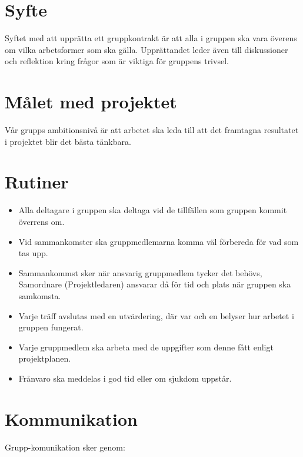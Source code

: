 \documentclass[11pt]{article}
\begin{document}
\begin{flushleft}
\section{Syfte}
Syftet med att upprätta ett gruppkontrakt är att alla i gruppen ska vara överens om vilka arbetsformer som ska gälla. Upprättandet leder även till diskussioner och reflektion kring frågor som är viktiga för gruppens trivsel.

\section{Målet med projektet}
Vår grupps ambitionsnivå är att arbetet ska leda till att det framtagna resultatet i projektet blir det bästa tänkbara.


\section{Rutiner}

\begin{itemize}
  \item Alla deltagare i gruppen ska deltaga vid de tillfällen som gruppen kommit överrens om.
  
  \item Vid sammankomster ska gruppmedlemarna komma väl förbereda för vad som tas upp.
  
  \item Sammankommst sker när ansvarig gruppmedlem tycker det behövs, Samordnare (Projektledaren) ansvarar då för tid och plats när gruppen ska samkomsta.
  
\item Varje träff avslutas med en utvärdering, där var och en belyser hur arbetet i gruppen fungerat.  
  
  \item Varje gruppmedlem ska arbeta med de uppgifter som denne fått enligt projektplanen.
  
  \item Frånvaro ska meddelas i god tid eller om sjukdom uppstår.
  
  
\end{itemize}


\section{Kommunikation}
Grupp-komunikation sker genom:
\begin{itemize}


\end{itemize}
\end{flushleft}
\end{document}
